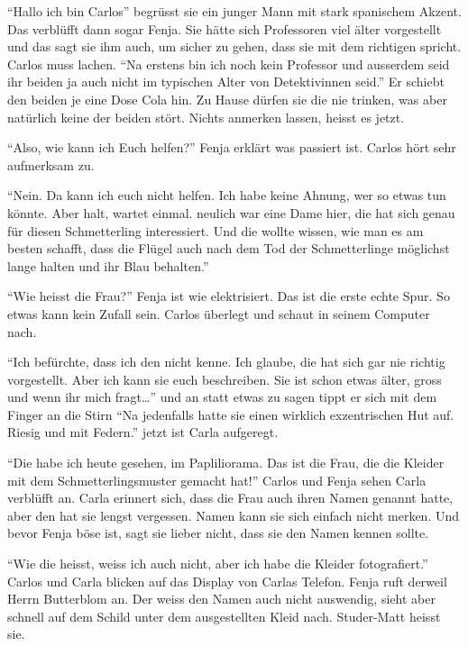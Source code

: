 \enquote{Hallo ich bin Carlos} begrüsst sie ein junger Mann mit stark spanischem Akzent. Das verblüfft dann sogar Fenja. Sie hätte sich Professoren viel älter vorgestellt und das sagt sie ihm auch, um sicher zu gehen, dass sie mit dem richtigen spricht. Carlos muss lachen. \enquote{Na erstens bin ich noch kein Professor und ausserdem seid ihr beiden ja auch nicht im typischen Alter von Detektivinnen seid.} Er schiebt den beiden je eine Dose Cola hin. Zu Hause dürfen sie die nie trinken, was aber natürlich keine der beiden stört. Nichts anmerken lassen, heisst es jetzt.

\enquote{Also, wie kann ich Euch helfen?} Fenja erklärt was passiert ist. Carlos hört sehr aufmerksam zu.

\enquote{Nein. Da kann ich euch nicht helfen. Ich habe keine Ahnung, wer so etwas tun könnte. Aber halt, wartet einmal. neulich war eine Dame hier, die hat sich genau für diesen Schmetterling interessiert. Und die wollte wissen, wie man es am besten schafft, dass die Flügel auch nach dem Tod der Schmetterlinge möglichst lange halten und ihr Blau behalten.}

\enquote{Wie heisst die Frau?} Fenja ist wie elektrisiert. Das ist die erste echte Spur. So etwas kann kein Zufall sein. Carlos überlegt und schaut in seinem Computer nach.

\enquote{Ich befürchte, dass ich den nicht kenne. Ich glaube, die hat sich gar nie richtig vorgestellt. Aber ich kann sie euch beschreiben. Sie ist schon etwas älter, gross und wenn ihr mich fragt\dots} und an statt etwas zu sagen tippt er sich mit dem Finger an die Stirn \enquote{Na jedenfalls hatte sie einen wirklich exzentrischen Hut auf. Riesig und mit Federn.} jetzt ist Carla aufgeregt. 

\enquote{Die habe ich heute gesehen, im Papliliorama. Das ist die Frau, die die Kleider mit dem Schmetterlingsmuster gemacht hat!} Carlos und Fenja sehen Carla verblüfft an. Carla erinnert sich, dass die Frau auch ihren Namen genannt hatte, aber den hat sie lengst vergessen. Namen kann sie sich einfach nicht merken. Und bevor Fenja böse ist, sagt sie lieber nicht, dass sie den Namen kennen sollte.

\enquote{Wie die heisst, weiss ich auch nicht, aber ich habe die Kleider fotografiert.} Carlos und Carla blicken auf das Display von Carlas Telefon. Fenja ruft derweil Herrn Butterblom an. Der weiss den Namen auch nicht auswendig, sieht aber schnell auf dem Schild unter dem ausgestellten Kleid nach. Studer-Matt heisst sie.

